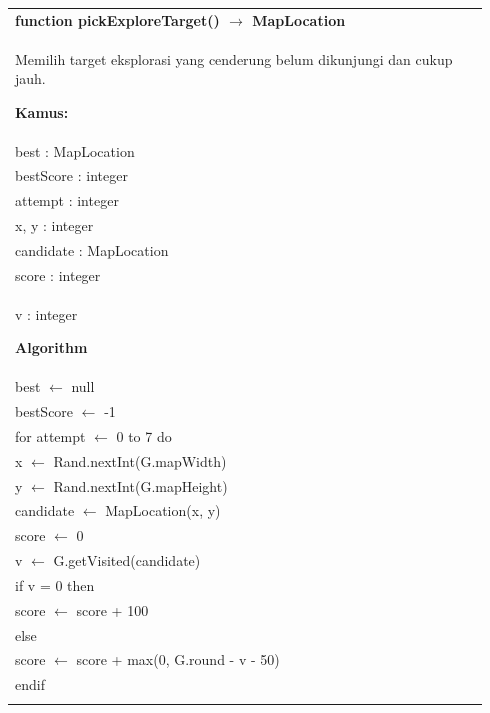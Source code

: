 \documentclass{article}
\newenvironment{pseudobox}
{
\centering
\begin{longtable}{|p{0.94\linewidth}|}
\hline
}
{
\\ \hline
\end{longtable}
\vspace{0.05cm}
}
\begin{document}
\begin{pseudobox}
\textbf{function pickExploreTarget() $\rightarrow$ MapLocation} \\
{ Memilih target eksplorasi yang cenderung belum dikunjungi dan cukup jauh. }

\textbf{Kamus:} \\
\hspace*{1em} best : MapLocation \\
\hspace*{1em} bestScore : integer \\
\hspace*{1em} attempt : integer \\
\hspace*{1em} x, y : integer \\
\hspace*{1em} candidate : MapLocation \\
\hspace*{1em} score : integer \\
\hspace*{1em} v : integer

\textbf{Algorithm} \\
\hspace*{1em} best $\leftarrow$ null \\
\hspace*{1em} bestScore $\leftarrow$ -1 \\

\hspace*{1em} for attempt $\leftarrow$ 0 to 7 do \\
\hspace*{2em} x $\leftarrow$ Rand.nextInt(G.mapWidth) \\
\hspace*{2em} y $\leftarrow$ Rand.nextInt(G.mapHeight) \\
\hspace*{2em} candidate $\leftarrow$ MapLocation(x, y) \\
\hspace*{2em} score $\leftarrow$ 0 \\

\hspace*{2em} v $\leftarrow$ G.getVisited(candidate) \\
\hspace*{2em} if v = 0 then \\
\hspace*{3em} score $\leftarrow$ score + 100 \\
\hspace*{2em} else \\
\hspace*{3em} score $\leftarrow$ score + max(0, G.round - v - 50) \\
\hspace*{2em} endif \\


\end{pseudobox}
\end{document}
